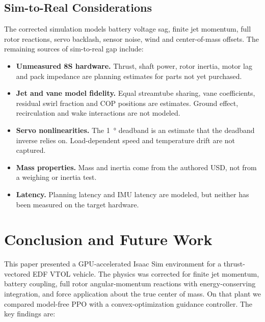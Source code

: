 \documentclass[conference]{IEEEtran}
\begin{document}
\subsection{Sim-to-Real Considerations}

The corrected simulation models battery voltage sag, finite jet momentum, full rotor reactions, servo backlash, sensor noise, wind and center-of-mass offsets. The remaining sources of sim-to-real gap include:

\begin{itemize}
    \item \textbf{Unmeasured 8S hardware.} Thrust, shaft power, rotor inertia, motor lag and pack impedance are planning estimates for parts not yet purchased.
    \item \textbf{Jet and vane model fidelity.} Equal streamtube sharing, vane coefficients, residual swirl fraction and COP positions are estimates. Ground effect, recirculation and wake interactions are not modeled.
    \item \textbf{Servo nonlinearities.} The \SI{1}{\degree} deadband is an estimate that the deadband inverse relies on. Load-dependent speed and temperature drift are not captured.
    \item \textbf{Mass properties.} Mass and inertia come from the authored USD, not from a weighing or inertia test.
    \item \textbf{Latency.} Planning latency and IMU latency are modeled, but neither has been measured on the target hardware.
\end{itemize}


\section{Conclusion and Future Work}

This paper presented a GPU-accelerated Isaac Sim environment for a thrust-vectored EDF VTOL vehicle. The physics was corrected for finite jet momentum, battery coupling, full rotor angular-momentum reactions with energy-conserving integration, and force application about the true center of mass. On that plant we compared model-free PPO with a convex-optimization guidance controller. The key findings are:
\end{document}
